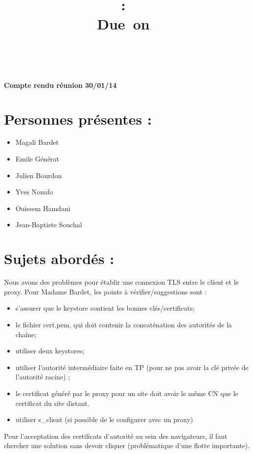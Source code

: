 \documentclass[a4paper,11pt,french]{article}
\title{
\vspace{2in}
\textmd{\textbf{\hmwkClass :\ \hmwkTitle}}\\
\normalsize\vspace{0.1in}\small{Due\ on\ \hmwkDueDate}\\
\vspace{0.1in}\large{\textit{\hmwkClassInstructor\ \hmwkClassTime}}
\vspace{3in}
}
\author{\hmwkAuthorName}
\date{} %
\newcommand{\hmwkDocName}{Compte rendu réunion 30/01/14} %
\begin{document}
\newcount\startdate
\newcount\daynum
\pagestyle{fancy}

\vspace*{5cm}
\begin{center}\textbf{\Huge{\hmwkDocName}}\end{center}
\vspace*{4.5cm}

\newpage




\section{Personnes présentes :}
\begin{itemize}
  \item Magali Bardet
  \item Emile Générat
  \item Julien Bourdon
  \item Yves Nouafo
  \item Ouissem Hamdani
  \item Jean-Baptiste Souchal
\end{itemize}

\section{Sujets abordés :}
Nous avons des problèmes pour établir une connexion TLS entre le client et le proxy.
Pour Madame Bardet, les points à vérifier/suggestions sont :
\begin{itemize}
\item s'assurer que le keystore contient les bonnes clés/certificats;
  \item le fichier cert.pem, qui doit contenir la concaténation des autorités de la chaîne;
  \item utiliser deux keystores;
  \item utiliser l'autorité intermédiaire faite en TP (pour ne pas avoir la clé privée de l'autorité racine) ;
  \item le certificat généré par le proxy pour un site doit avoir le même CN que le certificat du site distant.
  \item utiliser s\_client (si possible de le configurer avec un proxy)  
\end{itemize}

Pour l'acceptation des certificats d'autorité au sein des navigateurs, il faut chercher une solution sans devoir cliquer (problématique d'une flotte importante).
\end{document}
